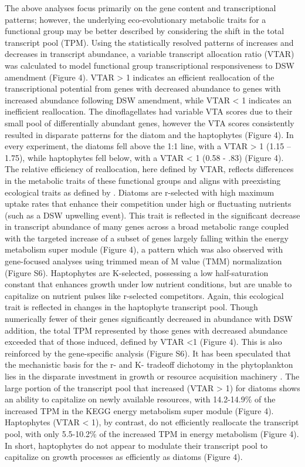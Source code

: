 The above analyses focus primarily on the gene content and transcriptional patterns; however, the underlying eco-evolutionary metabolic traits for a functional group may be better described by considering the shift in the total transcript pool (TPM). Using the statistically resolved patterns of increases and decreases in transcript abundance, a variable transcript allocation ratio (VTAR) was calculated to model functional group transcriptional responsiveness to DSW amendment (Figure 4). VTAR > 1 indicates an efficient reallocation of the transcriptional potential from genes with decreased abundance to genes with increased abundance following DSW amendment, while VTAR < 1 indicates an inefficient reallocation. The dinoflagellates had variable VTA scores due to their small pool of differentially abundant genes, however the VTA scores consistently resulted in disparate patterns for the diatom and the haptophytes (Figure 4). In every experiment, the diatoms fell above the 1:1 line, with a VTAR > 1 (1.15 – 1.75), while haptophytes fell below, with a VTAR < 1 (0.58 - .83) (Figure 4). The relative efficiency of reallocation, here defined by VTAR, reflects differences in the metabolic traits of these functional groups and aligns with preexisting ecological traits as defined by \citep{Margalef1978}. Diatoms are r-selected with high maximum uptake rates that enhance their competition under high or fluctuating nutrients (such as a DSW upwelling event). This trait is reflected in the significant decrease in transcript abundance of many genes across a broad metabolic range coupled with the targeted increase of a subset of genes largely falling within the energy metabolism super module (Figure 4), a pattern which was also observed with gene-focused analyses using trimmed mean of M value (TMM) normalization \citep{Marchetti2012,Robinson2010} (Figure S6). Haptophytes are K-selected, possessing a low half-saturation constant that enhances growth under low nutrient conditions, but are unable to capitalize on nutrient pulses like r-selected competitors. Again, this ecological trait is reflected in changes in the haptophyte transcript pool. Though numerically fewer of their genes significantly decreased in abundance with DSW addition, the total TPM represented by those genes with decreased abundance exceeded that of those induced, defined by VTAR <1 (Figure 4). This is also reinforced by the gene-specific analysis (Figure S6). It has been speculated that the mechanistic basis for the r- and K- tradeoff dichotomy in the phytoplankton lies in the disparate investment in growth or resource acquisition machinery \citep{Litchman2008}. The large portion of the transcript pool that increased (VTAR > 1) for diatoms shows an ability to capitalize on newly available resources, with 14.2-14.9\% of the increased TPM in the KEGG energy metabolism super module (Figure 4). Haptophytes (VTAR < 1), by contrast, do not efficiently reallocate the transcript pool, with only 5.5-10.2\% of the increased TPM in energy metabolism (Figure 4). In short, haptophytes do not appear to modulate their transcript pool to capitalize on growth processes as efficiently as diatoms (Figure 4). \par
